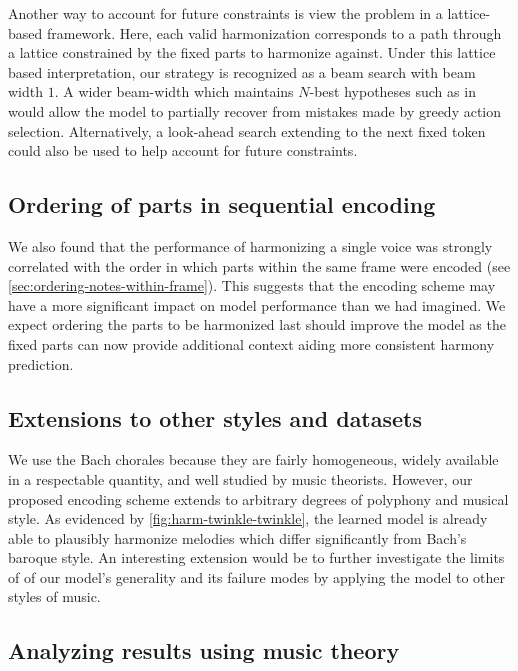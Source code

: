 Another way to account for future constraints is view the problem in a
lattice-based framework. Here, each valid harmonization corresponds to a path
through a lattice constrained by the fixed parts to harmonize against. Under
this lattice based interpretation, our strategy is recognized as a beam search
with beam width $1$. A wider beam-width which maintains $N$-best hypotheses
such as in \citet{liu2014efficient} would allow the model to partially recover
from mistakes made by greedy action selection. Alternatively, a
look-ahead search \citep{norvig1992paradigms} extending to the next fixed token
could also be used to help account for future constraints.

\subsection{Ordering of parts in sequential encoding}

We also found that the performance of harmonizing a single voice was strongly
correlated with the order in which parts within the same frame were encoded
(see \vref{sec:ordering-notes-within-frame}). This suggests that the encoding
scheme may have a more significant impact on model performance than we had
imagined. We expect ordering the parts to be harmonized last should improve the
model as the fixed parts can now provide additional context aiding more
consistent harmony prediction.

\subsection{Extensions to other styles and datasets}

We use the Bach chorales because they are fairly homogeneous, widely available
in a respectable quantity, and well studied by music theorists. However, our
proposed encoding scheme extends to arbitrary degrees of polyphony and musical
style. As evidenced by \vref{fig:harm-twinkle-twinkle}, the learned model is
already able to plausibly harmonize melodies which differ significantly from
Bach's baroque style. An interesting extension would be to further investigate
the limits of of our model's generality and its failure modes by applying
the model to other styles of music.

\subsection{Analyzing results using music theory}

